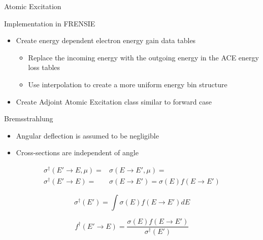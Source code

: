 \documentclass{beamer}
\begin{document}
\begin{frame}{Atomic Excitation}

\begin{block}{Implementation in FRENSIE}
	\begin{itemize}
	\item Create energy dependent electron energy gain data tables
		\begin{itemize}
		\item Replace the incoming energy with the outgoing energy in the ACE energy loss tables
		\item Use interpolation to create a more uniform energy bin structure
		\end{itemize}
	
	\item Create Adjoint Atomic Excitation class similar to forward case
	\end{itemize}
\end{block}

\end{frame}

\begin{frame}{Bremsstrahlung}
	\begin{itemize}
	\item Angular deflection is assumed to be negligible
	\item Cross-sections are independent of angle
	\end{itemize}

\begin{align}
\sigma^{\dagger}(E' \rightarrow E, \mu) = & \sigma(E \rightarrow E', \mu) =\nonumber \\
\sigma^{\dagger}(E' \rightarrow E) = & \sigma(E \rightarrow E') = \sigma(E)f(E \rightarrow E')
\end{align}

\begin{equation}
\sigma^{\dagger}(E') = \int\sigma(E)f(E \rightarrow E')dE
\end{equation}

\begin{equation}
f^{\dagger}(E' \rightarrow E) = \frac{\sigma(E)f(E \rightarrow E')}{\sigma^{\dagger}(E')}
\end{equation}


\end{frame}
\end{document}
